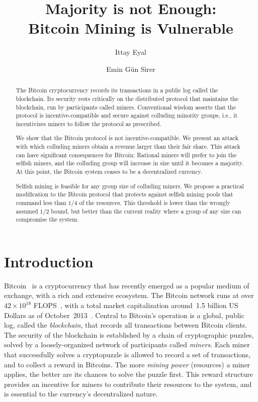 \documentclass[letterpaper]{llncs}
\title{ 
Majority is not Enough: \\
Bitcoin Mining is Vulnerable
}
\date{}
\author{Ittay Eyal \and Emin G\"un Sirer}
\institute{Department of Computer Science, Cornell University \\
               ittay.eyal@cornell.edu, egs@systems.cs.cornell.edu \\
               \negspace\negspace\negspace}
\begin{document}
 

\maketitle



\begin{abstract} 
The Bitcoin cryptocurrency records its transactions in a public log called the blockchain. Its security rests critically on the distributed protocol that maintains the blockchain, run by participants called miners. 
Conventional wisdom asserts that the protocol is incentive-compatible and secure against colluding minority groups, i.e., it incentivizes miners to follow the protocol as prescribed. 

We show that the Bitcoin protocol is not incentive-compatible. We present an attack with which colluding miners obtain a revenue larger than their fair share. 
This attack can have significant consequences for Bitcoin: Rational miners will prefer to join the selfish miners, and the colluding group will increase in size until it becomes a majority. At this point, the Bitcoin system ceases to be a decentralized currency. 

Selfish mining is feasible for any group size of colluding miners.
We propose a practical modification to the Bitcoin protocol that protects against selfish mining pools that command less than $1/4$ of the resources. 
This threshold is lower than the wrongly assumed $1/2$ bound, but better than the current reality where a group of any size can compromise the system. 
\end{abstract} 



    \section{Introduction} \label{sec:intro}
    
Bitcoin~\cite{nakamoto2008bitcoin} is a cryptocurrency that has recently emerged as a popular medium of exchange, with a rich and extensive ecosystem. 
The Bitcoin network runs at over $42\times 10^{18}$ FLOPS~\cite{bitcoinCharts2013stats}, with a total market capitalization around~1.5 billion US Dollars as of October~2013~\cite{blockchain2013marketCap}. 
Central to Bitcoin's operation is a global, public log, called the {\em blockchain}, that records all transactions between Bitcoin clients.
The security of the blockchain is established by a chain of cryptographic puzzles, solved by a loosely-organized network of participants called {\em miners}. 
Each miner that successfully solves a cryptopuzzle is allowed to record a set of transactions, and to collect a reward in Bitcoins.
The more \emph{mining power} (resources) a miner applies, the better are its chances to solve the puzzle first. 
This reward structure provides an incentive for miners to contribute their resources to the system, and is essential to the currency's decentralized nature. 
\end{document}

